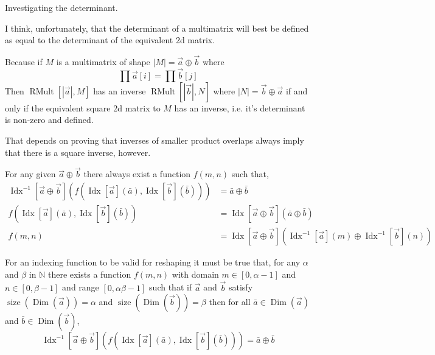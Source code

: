 \documentclass[12pt]{book}
\theoremstyle{plain}
\theoremstyle{definition}
\theoremstyle{ppart}
\theoremstyle{case}
\theoremstyle{solution}
\DeclareMathOperator{\Dim}{Dim}
\DeclareMathOperator{\RMult}{RMult}
\DeclareMathOperator{\Idx}{Idx}
\DeclareMathOperator{\size}{size}
\newcommand{\shape}[1]{\left|#1\right|}
\begin{document}
\begin{appendices}
Investigating the determinant.

I think, unfortunately, that the determinant of a multimatrix will best be defined as
equal to the determinant of the equivalent 2d matrix.

Because if $M$ is a multimatrix of shape $\shape{M} = \vec{a} \oplus \vec{b}$ where
\[\prod \vec{a}[i] = \prod \vec{b}[j]\]
Then $\RMult[\shape{\vec{a}},M]$ has an inverse $\RMult[\shape{\vec{b}},N]$
where $\shape{N} = \vec{b} \oplus \vec{a}$ if and only if the
equivalent square 2d matrix to $M$ has an inverse, i.e. it's determinant is non-zero and defined.

That depends on proving that inverses of smaller product overlaps always imply
that there is a square inverse, however.

\begin{landscape}

For any given $\vec{a} \oplus \vec{b}$ there always exist a function $f(m, n)$ such that,
\begin{align*}
  \Idx^{-1}[\vec{a} \oplus \vec{b}]\left(f(\Idx[\vec{a}](\bar{a}), \Idx[\vec{b}](\bar{b}))\right) &= \bar{a} \oplus \bar{b} \\
  f(\Idx[\vec{a}](\bar{a}), \Idx[\vec{b}](\bar{b})) &= \Idx[\vec{a} \oplus \vec{b}](\bar{a} \oplus \bar{b}) \\
  f(m, n) &= \Idx[\vec{a} \oplus \vec{b}](\Idx^{-1}[\vec{a}](m) \oplus \Idx^{-1}[\vec{b}](n))
\end{align*}

For an indexing function to be valid for reshaping it must be true that,
for any $\alpha$ and $\beta$ in $\mathbb{N}$ there exists a function $f(m, n)$ with domain $m \in [0,\alpha-1]$ and $n \in [0,\beta-1]$
and range $[0, \alpha \beta - 1]$ such that if $\vec{a}$ and $\vec{b}$ satisfy $\size(\Dim(\vec{a})) = \alpha$ and $\size(\Dim(\vec{b})) = \beta$
then for all $\bar{a} \in \Dim(\vec{a})$ and $\bar{b} \in \Dim(\vec{b})$,
\[ \Idx^{-1}[\vec{a} \oplus \vec{b}]\left(f(\Idx[\vec{a}](\bar{a}), \Idx[\vec{b}](\bar{b}))\right) = \bar{a} \oplus \bar{b} \]


\end{landscape}
\end{appendices}
\end{document}
